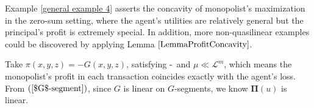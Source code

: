 Example \ref{general example 4} asserts the concavity of monopolist's maximization in the zero-sum setting,
where the agent's utilities are relatively general but the principal's profit is extremely special. In addition, more non-quasilinear examples could be discovered by applying Lemma $\ref{LemmaProfitConcavity}$.\medskip



\begin{example}\label{general example 4}
	Take $\pi(x, y, z) = -G(x,y,z)$, satisfying \Gzero-\Gfive\ and $\mu\ll \mathcal{L}^m$, which means the monopolist's profit in each transaction coincides exactly with the 
	agent's loss. From $(\ref{$G$-segment})$, since $G$ is linear on $G$-segments, we know $\pmb \Pi(u)$ is linear.
\end{example}			




